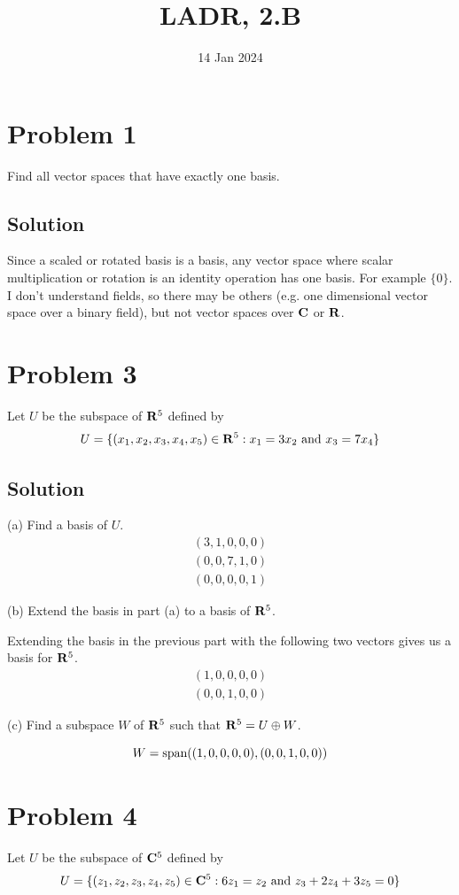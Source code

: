 \documentclass{article}
\title{LADR, 2.B}
\date{14 Jan 2024}
\begin{document}
\maketitle

\section*{Problem 1}
Find all vector spaces that have exactly one basis.

\subsection*{Solution}
Since a scaled or rotated basis is a basis, any vector space where scalar multiplication or rotation is an identity operation has one basis. For example $\{0\}$. I don't understand fields, so there may be others (e.g. one dimensional vector space over a binary field), but not vector spaces over $\mathbf{C}$ or $\mathbf{R}$.

\section*{Problem 3}
Let $U$ be the subspace of $\mathbf{R}^5$ defined by
\[U=\{ (x_1, x_2, x_3, x_4, x_5)\in\mathbf{R}^5 : x_1=3x_2 \text{ and } x_3=7x_4 \}\]

\subsection*{Solution}
(a) Find a basis of $U$.
\begin{align*}
(3, 1, 0, 0, 0)\\
(0, 0, 7, 1, 0)\\
(0, 0, 0, 0, 1)
\end{align*}

(b) Extend the basis in part (a) to a basis of $\mathbf{R}^5$.

Extending the basis in the previous part with the following two vectors gives us a basis for $\mathbf{R}^5$.
\begin{align*}
(1, 0, 0, 0, 0)\\
(0, 0, 1, 0, 0)
\end{align*}

(c) Find a subspace $W$ of $\mathbf{R}^5$ such that $\mathbf{R}^5=U\oplus W$.

\[W=\text{span}((1, 0, 0, 0, 0), (0, 0, 1, 0, 0))\]

\section*{Problem 4}
Let $U$ be the subspace of $\mathbf{C}^5$ defined by
\[U=\{ (z_1, z_2, z_3, z_4, z_5)\in\mathbf{C}^5 : 6z_1=z_2 \text{ and } z_3+2z_4+3z_5=0 \}\]
\end{document}
